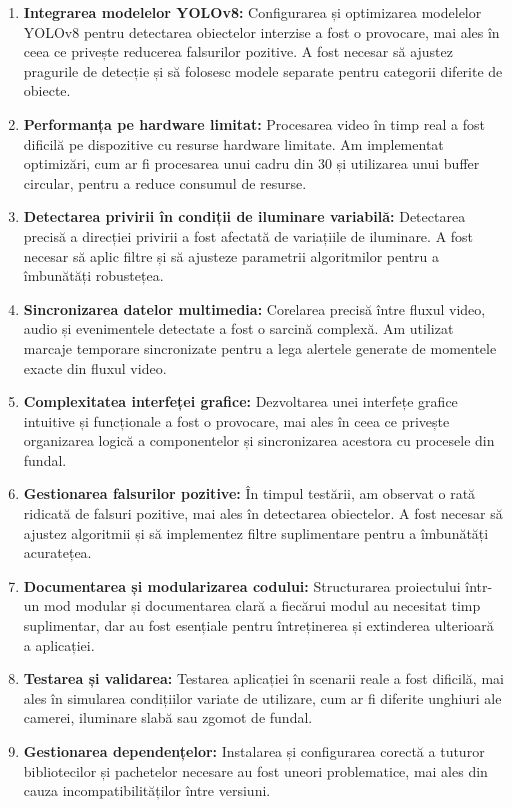 \documentclass[12pt,a4paper]{article}
\begin{document}
\begin{enumerate}
    \item \textbf{Integrarea modelelor YOLOv8:} Configurarea și optimizarea modelelor YOLOv8 pentru detectarea obiectelor interzise a fost o provocare, mai ales în ceea ce privește reducerea falsurilor pozitive. A fost necesar să ajustez pragurile de detecție și să folosesc modele separate pentru categorii diferite de obiecte.

    \item \textbf{Performanța pe hardware limitat:} Procesarea video în timp real a fost dificilă pe dispozitive cu resurse hardware limitate. Am implementat optimizări, cum ar fi procesarea unui cadru din 30 și utilizarea unui buffer circular, pentru a reduce consumul de resurse.

    \item \textbf{Detectarea privirii în condiții de iluminare variabilă:} Detectarea precisă a direcției privirii a fost afectată de variațiile de iluminare. A fost necesar să aplic filtre și să ajusteze parametrii algoritmilor pentru a îmbunătăți robustețea.

    \item \textbf{Sincronizarea datelor multimedia:} Corelarea precisă între fluxul video, audio și evenimentele detectate a fost o sarcină complexă. Am utilizat marcaje temporare sincronizate pentru a lega alertele generate de momentele exacte din fluxul video.

    \item \textbf{Complexitatea interfeței grafice:} Dezvoltarea unei interfețe grafice intuitive și funcționale a fost o provocare, mai ales în ceea ce privește organizarea logică a componentelor și sincronizarea acestora cu procesele din fundal.

    \item \textbf{Gestionarea falsurilor pozitive:} În timpul testării, am observat o rată ridicată de falsuri pozitive, mai ales în detectarea obiectelor. A fost necesar să ajustez algoritmii și să implementez filtre suplimentare pentru a îmbunătăți acuratețea.

    \item \textbf{Documentarea și modularizarea codului:} Structurarea proiectului într-un mod modular și documentarea clară a fiecărui modul au necesitat timp suplimentar, dar au fost esențiale pentru întreținerea și extinderea ulterioară a aplicației.

    \item \textbf{Testarea și validarea:} Testarea aplicației în scenarii reale a fost dificilă, mai ales în simularea condițiilor variate de utilizare, cum ar fi diferite unghiuri ale camerei, iluminare slabă sau zgomot de fundal.

    \item \textbf{Gestionarea dependențelor:} Instalarea și configurarea corectă a tuturor bibliotecilor și pachetelor necesare au fost uneori problematice, mai ales din cauza incompatibilităților între versiuni.
\end{enumerate}
\end{document}
